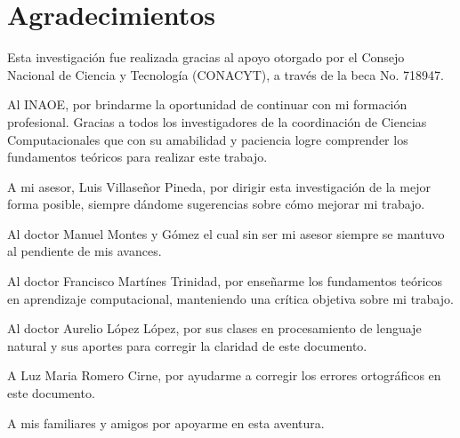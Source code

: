 
\chapter{Agradecimientos}

Esta investigación fue realizada gracias al apoyo otorgado por el Consejo Nacional de Ciencia y Tecnología (CONACYT), a través de la beca No. 718947. 

Al INAOE, por brindarme la oportunidad de continuar con mi formación profesional. Gracias a todos los investigadores de la coordinación de Ciencias Computacionales que con su amabilidad y paciencia logre comprender los fundamentos teóricos para realizar este trabajo. 

A mi asesor, Luis Villaseñor Pineda, por dirigir esta investigación de la mejor forma posible, siempre dándome sugerencias sobre cómo mejorar mi trabajo.

Al doctor Manuel Montes y Gómez el cual sin ser mi asesor siempre se mantuvo al pendiente de mis avances.

Al doctor Francisco Martínes Trinidad, por enseñarme los fundamentos teóricos en aprendizaje computacional, manteniendo una crítica objetiva sobre mi trabajo.

Al doctor Aurelio López López, por sus clases en procesamiento de lenguaje natural y sus aportes para corregir la claridad de este documento.

A Luz Maria Romero Cirne, por ayudarme a corregir los errores ortográficos en este documento.

A mis familiares y amigos por apoyarme en esta aventura.



